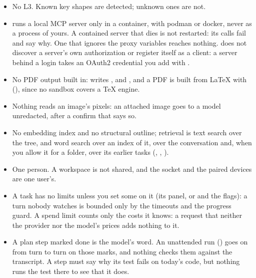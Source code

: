 \begin{itemize}
\item No L3. Known key shapes are detected; unknown ones are not.
\item \nodwyn{} runs a local MCP server only in a container, with podman or
  docker, never as a process of yours. A contained server that dies is not
  restarted: its calls fail and say why. One that ignores the proxy
  variables reaches nothing. \nodwyn{} does not
  discover a server's own authorization or register itself as a client: a
  server behind a login takes an OAuth2 credential you add with
  .
\item No PDF output built in:  writes ,
   and , and a PDF is built from LaTeX with
   (), since no sandbox covers a TeX engine.
\item Nothing reads an image's pixels: an attached image goes to a model
  unredacted, after a confirm that says so.
\item No embedding index and no structural outline; retrieval is text
  search over the tree, and word search over an index of it, over the
  conversation and, when you allow it for a folder, over its earlier tasks
  (, , ).
\item One person. A workspace is not shared, and the socket and the paired
  devices are one user's.
\item A task has no limits unless you set some on it (its panel, or
   and the  flags): a turn
  nobody watches is bounded only by the timeouts and the progress guard. A
  spend limit counts only the costs it knows: a request that neither the provider nor
  the model's  prices adds nothing to it.
\item A plan step marked done is the model's word. An unattended run
  () goes on from turn to turn on those
  marks, and nothing checks them against the transcript. A 
  step must say why its test fails on today's code, but nothing runs the
  test there to see that it does.
\end{itemize}
